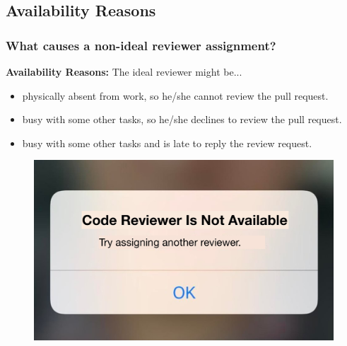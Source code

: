 \documentclass{beamer}
\begin{document}
\subsection{Availability Reasons}
\begin{frame}
\frametitle{\large What causes a non-ideal reviewer assignment?}
    \textbf{Availability Reasons:} \newline
    The ideal reviewer might be...
    \begin{itemize}
        \item  physically absent from work, so he/she cannot review the pull request. 
    \item  busy with some other tasks, so he/she declines to review the pull request.
    \item busy with some other tasks and is late to reply the review request.
    \end{itemize}
      \begin{figure}
      \includegraphics[scale=0.1]{img/reviewer_available.jpg}
      \end{figure}

\end{frame}

\end{document}
